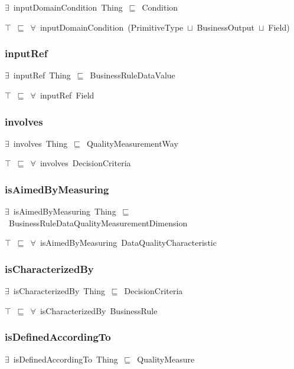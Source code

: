 \documentclass{article}
\begin{document}
\ensuremath{\exists}~inputDomainCondition~Thing~\ensuremath{\sqsubseteq}~Condition

\ensuremath{\top}~\ensuremath{\sqsubseteq}~\ensuremath{\forall}~inputDomainCondition~(PrimitiveType~\ensuremath{\sqcup}~BusinessOutput~\ensuremath{\sqcup}~Field)

\subsubsection*{inputRef}

\ensuremath{\exists}~inputRef~Thing~\ensuremath{\sqsubseteq}~BusinessRuleDataValue

\ensuremath{\top}~\ensuremath{\sqsubseteq}~\ensuremath{\forall}~inputRef~Field

\subsubsection*{involves}

\ensuremath{\exists}~involves~Thing~\ensuremath{\sqsubseteq}~QualityMeasurementWay

\ensuremath{\top}~\ensuremath{\sqsubseteq}~\ensuremath{\forall}~involves~DecisionCriteria

\subsubsection*{isAimedByMeasuring}

\ensuremath{\exists}~isAimedByMeasuring~Thing~\ensuremath{\sqsubseteq}~BusinessRuleDataQualityMeasurementDimension

\ensuremath{\top}~\ensuremath{\sqsubseteq}~\ensuremath{\forall}~isAimedByMeasuring~DataQualityCharacteristic

\subsubsection*{isCharacterizedBy}

\ensuremath{\exists}~isCharacterizedBy~Thing~\ensuremath{\sqsubseteq}~DecisionCriteria

\ensuremath{\top}~\ensuremath{\sqsubseteq}~\ensuremath{\forall}~isCharacterizedBy~BusinessRule

\subsubsection*{isDefinedAccordingTo}

\ensuremath{\exists}~isDefinedAccordingTo~Thing~\ensuremath{\sqsubseteq}~QualityMeasure
\end{document}
